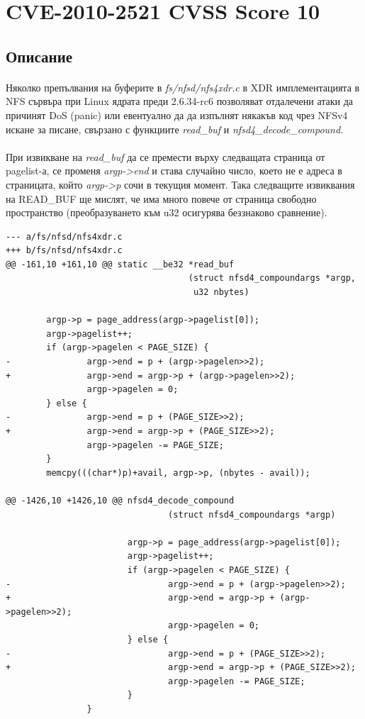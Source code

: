 \documentclass[a4paper,12pt,leqno]{article}
\begin{document}
\section{CVE-2010-2521 CVSS Score 10}
\subsection{Описание}
\paragraph{}
Няколко препълвания на буферите в \textit{fs/nfsd/nfs4xdr.c} в XDR имплементацията в NFS сървъра при Linux ядрата преди 2.6.34-rc6 позволяват отдалечени атаки да причинят DoS (panic) или евентуално да да изпълнят някакъв код чрез NFSv4 искане за писане, свързано с функциите \textit{read\_buf} и \textit{nfsd4\_decode\_compound}. 
\paragraph{}
При извикване на \textit{read\_buf} да се премести върху следващата страница от pagelist-а, се променя \textit{argp->end} и става случайно число, което не е адреса в страницата, който \textit{argp->p} сочи в текущия момент. Така следващите извиквания на READ\_BUF ще мислят, че има много повече от страница свободно пространство (преобразуването към u32 осигурява беззнаково сравнение).
\begin{verbatim}
--- a/fs/nfsd/nfs4xdr.c
+++ b/fs/nfsd/nfs4xdr.c
@@ -161,10 +161,10 @@ static __be32 *read_buf
                                    (struct nfsd4_compoundargs *argp,
                                     u32 nbytes)
                                     
        argp->p = page_address(argp->pagelist[0]);
        argp->pagelist++;
        if (argp->pagelen < PAGE_SIZE) {
-               argp->end = p + (argp->pagelen>>2);
+               argp->end = argp->p + (argp->pagelen>>2);
                argp->pagelen = 0;
        } else {
-               argp->end = p + (PAGE_SIZE>>2);
+               argp->end = argp->p + (PAGE_SIZE>>2);
                argp->pagelen -= PAGE_SIZE;
        }
        memcpy(((char*)p)+avail, argp->p, (nbytes - avail));

@@ -1426,10 +1426,10 @@ nfsd4_decode_compound
                                (struct nfsd4_compoundargs *argp)
                                
                        argp->p = page_address(argp->pagelist[0]);
                        argp->pagelist++;
                        if (argp->pagelen < PAGE_SIZE) {
-                               argp->end = p + (argp->pagelen>>2);
+                               argp->end = argp->p + (argp->pagelen>>2);
                                argp->pagelen = 0;
                        } else {
-                               argp->end = p + (PAGE_SIZE>>2);
+                               argp->end = argp->p + (PAGE_SIZE>>2);
                                argp->pagelen -= PAGE_SIZE;
                        }
                }
\end{verbatim}
\end{document}

